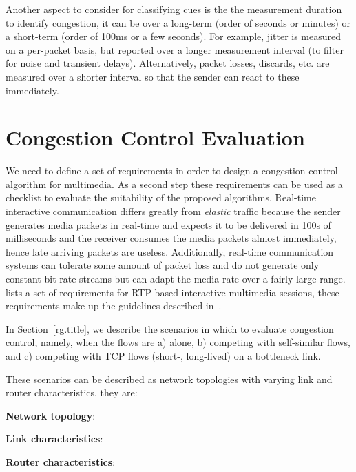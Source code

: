 
Another aspect to consider for classifying cues is the the measurement
duration to identify congestion, it can be over a long-term (order of seconds
or minutes) or a short-term (order of 100ms or a few seconds). For example,
jitter is measured on a per-packet basis, but reported over a longer
measurement interval (to filter for noise and transient delays).
Alternatively, packet losses, discards, etc. are measured over a shorter
interval so that the sender can react to these immediately.

\section{Congestion Control Evaluation}
\label{fw.cc.eval}

We need to define a set of requirements in order to design a congestion
control algorithm for multimedia. As a second step these requirements can be
used as a checklist to evaluate the suitability of the proposed algorithms.
Real-time interactive communication differs greatly from \emph{elastic}
traffic because the sender generates media packets in real-time and expects it
to be delivered in 100s of milliseconds and the receiver consumes the media
packets almost immediately, hence late arriving packets are useless.
Additionally, real-time communication systems can tolerate some amount of
packet loss and do not generate only constant bit rate streams but can adapt
the media rate over a fairly large range. \cite{draft.rmcat.req} lists a set
of requirements for RTP-based interactive multimedia sessions, these
requirements make up the guidelines described in~\cite{draft.rmcat.evaluate}.

In Section~\ref{rg.title}, we describe the scenarios in which to evaluate
congestion control, namely, when the flows are a) alone, b) competing with
self-similar flows, and c) competing with TCP flows (short-, long-lived) on a
bottleneck link.

These scenarios can be described as network topologies with varying link and
router characteristics, they are:

\textbf{Network topology}:

\textbf{Link characteristics}:

\textbf{Router characteristics}:


